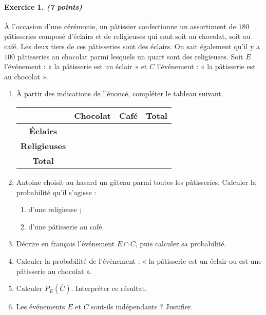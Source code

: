 \documentclass[11pt]{article}
\begin{document}
\paragraph{Exercice 1. \emph{(7 points)}}À l’occasion d’une cérémonie, un pâtissier confectionne
un assortiment de $180$ pâtisseries composé d’éclairs et de religieuses qui sont
soit au chocolat, soit au café. Les deux tiers de ces pâtisseries sont des
éclairs. On sait également qu’il y a $100$ pâtisseries au chocolat parmi
lesquels un quart sont des religieuses.
Soit $E$ l'événement : « la pâtisserie est un éclair » et $C$ l'événement : « la
pâtisserie est au chocolat ».
\begin{enumerate}
  \item À partir des indications de l'énoncé, compléter le tableau suivant.
    \begin{center}
      \def\arraystretch{1.5}
    \begin{tabular}{|c|c|c|c|}
      \hline
      & \textbf{Chocolat} & \textbf{Café} & \textbf{Total} \\
      \hline
      \textbf{Éclairs} & & & \\
      \hline
      \textbf{Religieuses} & & & \\
      \hline
      \textbf{Total} & & & \\
      \hline
    \end{tabular}
    \end{center}
  \item Antoine choisit au hasard un g\^ateau parmi toutes les p\^atisseries.
    Calculer la probabilité qu'il s'agisse :
    \begin{enumerate}
      \item d'une religieuse ;
      \item d'une p\^atisserie au café.
    \end{enumerate}
  \item Décrire en français l'événement $E\cap C$, puis calculer sa probabilité.
  \item Calculer la probabilité de l'événement : « la p\^atisserie est un éclair
    ou est une p\^atisserie au chocolat ».
  \item Calculer $P_E(\overline C)$. Interpréter ce résultat.
  \item Les événements $E$ et $C$ sont-ils indépendants ? Justifier.
\end{enumerate}
\newpage
\end{document}
